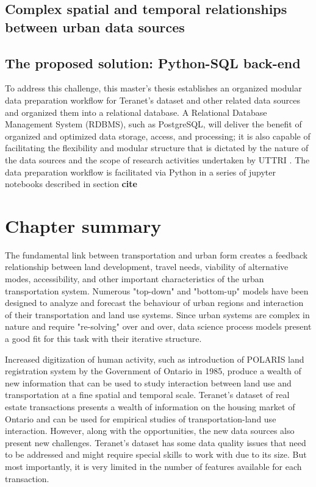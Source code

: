 \subsection{Complex spatial and temporal relationships between urban data sources} \label{subsec:complex_spatio-temporal_relationships_between_urban_data_sources}


\subsection{The proposed solution: Python-SQL back-end} \label{subsec:proposed_solution_python_sql_backend}

To address this challenge, this master's thesis establishes an organized modular data preparation workflow for Teranet's dataset and other related data sources and organized them into a relational database.
A Relational Database Management System (RDBMS), such as PostgreSQL, will deliver the benefit of organized and optimized data storage, access, and processing;
it is also capable of facilitating the flexibility and modular structure that is dictated by the nature of the data sources and the scope of research activities undertaken by UTTRI .
The data preparation workflow is facilitated via Python in a series of jupyter notebooks described in section \textbf{cite}

\section{Chapter summary} \label{sec:background_summary}

The fundamental link between transportation and urban form creates a feedback relationship between land development, travel needs, viability of alternative modes, accessibility, and other important characteristics of the urban transportation system.
Numerous "top-down" and "bottom-up" models have been designed to analyze and forecast the behaviour of urban regions and interaction of their transportation and land use systems.
Since urban systems are complex in nature and require "re-solving" over and over, data science process models present a good fit for this task with their iterative structure.

Increased digitization of human activity, such as introduction of POLARIS land registration system by the Government of Ontario in 1985, produce a wealth of new information that can be used to study interaction between land use and transportation at a fine spatial and temporal scale.
Teranet's dataset of real estate transactions presents a wealth of information on the housing market of Ontario and can be used for empirical studies of transportation-land use interaction.
However, along with the opportunities, the new data sources also present new challenges.
Teranet's dataset has some data quality issues that need to be addressed and might require special skills to work with due to its size.
But most importantly, it is very limited in the number of features available for each transaction.

